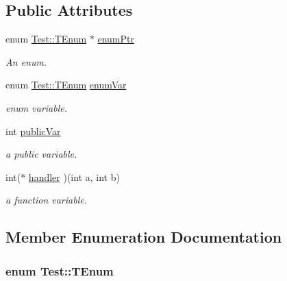 \subsection*{Public Attributes}
\begin{DoxyCompactItemize}
\item 
enum \hyperlink{classTest_ad8d13fe56b896633273087859b89a1a3}{Test::TEnum} $\ast$ \hyperlink{classTest_add1f72d205230e7bac3fcc70a65c1de2}{enumPtr}
\begin{DoxyCompactList}\small\item\em An enum. \item\end{DoxyCompactList}\item 
enum \hyperlink{classTest_ad8d13fe56b896633273087859b89a1a3}{Test::TEnum} \hyperlink{classTest_a0bd371828a36ad7ea83dfd07b2a672b5}{enumVar}
\begin{DoxyCompactList}\small\item\em enum variable. \item\end{DoxyCompactList}\item 
int \hyperlink{classTest_a3085f973ef857d85d647bf04e89760d0}{publicVar}
\begin{DoxyCompactList}\small\item\em a public variable. \item\end{DoxyCompactList}\item 
int($\ast$ \hyperlink{classTest_a8bef142724c4059c18f752e630a4d925}{handler} )(int a, int b)
\begin{DoxyCompactList}\small\item\em a function variable. \item\end{DoxyCompactList}\end{DoxyCompactItemize}


\subsection{Member Enumeration Documentation}
\hypertarget{classTest_ad8d13fe56b896633273087859b89a1a3}{
\subsubsection[{TEnum}]{\setlength{\rightskip}{0pt plus 5cm}enum {\bf Test::TEnum}}}
\label{classTest_ad8d13fe56b896633273087859b89a1a3}


